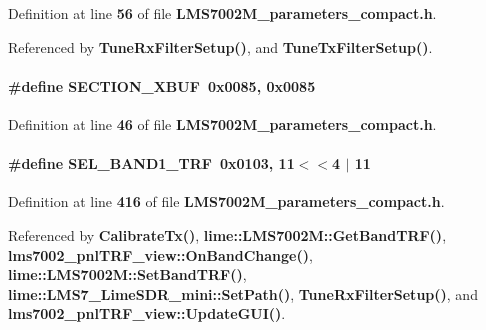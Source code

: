 Definition at line {\bf 56} of file {\bf L\+M\+S7002\+M\+\_\+parameters\+\_\+compact.\+h}.



Referenced by {\bf Tune\+Rx\+Filter\+Setup()}, and {\bf Tune\+Tx\+Filter\+Setup()}.

\paragraph[{S\+E\+C\+T\+I\+O\+N\+\_\+\+X\+B\+UF}]{\setlength{\rightskip}{0pt plus 5cm}\#define S\+E\+C\+T\+I\+O\+N\+\_\+\+X\+B\+UF~0x0085, 0x0085}\label{LMS7002M__parameters__compact_8h_a25db8c6d017e2d45fb0a397035146f6c}


Definition at line {\bf 46} of file {\bf L\+M\+S7002\+M\+\_\+parameters\+\_\+compact.\+h}.

\paragraph[{S\+E\+L\+\_\+\+B\+A\+N\+D1\+\_\+\+T\+RF}]{\setlength{\rightskip}{0pt plus 5cm}\#define S\+E\+L\+\_\+\+B\+A\+N\+D1\+\_\+\+T\+RF~0x0103, 11$<$$<$4 $\vert$  11}\label{LMS7002M__parameters__compact_8h_a82b6b655dfc9648671cd71a0a2369055}


Definition at line {\bf 416} of file {\bf L\+M\+S7002\+M\+\_\+parameters\+\_\+compact.\+h}.



Referenced by {\bf Calibrate\+Tx()}, {\bf lime\+::\+L\+M\+S7002\+M\+::\+Get\+Band\+T\+R\+F()}, {\bf lms7002\+\_\+pnl\+T\+R\+F\+\_\+view\+::\+On\+Band\+Change()}, {\bf lime\+::\+L\+M\+S7002\+M\+::\+Set\+Band\+T\+R\+F()}, {\bf lime\+::\+L\+M\+S7\+\_\+\+Lime\+S\+D\+R\+\_\+mini\+::\+Set\+Path()}, {\bf Tune\+Rx\+Filter\+Setup()}, and {\bf lms7002\+\_\+pnl\+T\+R\+F\+\_\+view\+::\+Update\+G\+U\+I()}.


